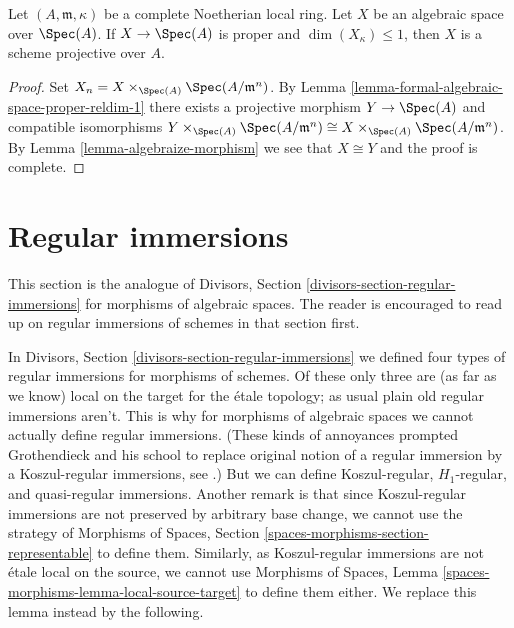 \begin{lemma}
\label{lemma-projective-over-complete}
Let $(A, \mathfrak m, \kappa)$ be a complete Noetherian local ring.
Let $X$ be an algebraic space over $\Spec(A)$.
If $X \to \Spec(A)$ is proper and $\dim(X_\kappa) \leq 1$, then
$X$ is a scheme projective over $A$.
\end{lemma}

\begin{proof}
Set $X_n = X \times_{\Spec(A)} \Spec(A/\mathfrak m^n)$.
By Lemma \ref{lemma-formal-algebraic-space-proper-reldim-1}
there exists a projective morphism $Y \to \Spec(A)$
and compatible isomorphisms
$Y \times_{\Spec(A)} \Spec(A/\mathfrak m^n) \cong
X \times_{\Spec(A)} \Spec(A/\mathfrak m^n)$.
By Lemma \ref{lemma-algebraize-morphism}
we see that $X \cong Y$ and the proof is complete.
\end{proof}










\section{Regular immersions}
\label{section-regular-immersions}

\noindent
This section is the analogue of
Divisors, Section \ref{divisors-section-regular-immersions}
for morphisms of algebraic spaces. The reader is encouraged to read up
on regular immersions of schemes in that section first.

\medskip\noindent
In
Divisors, Section \ref{divisors-section-regular-immersions}
we defined four types of regular immersions for morphisms of schemes.
Of these only three are (as far as we know) local on the target for
the \'etale topology; as usual plain old regular immersions aren't.
This is why for morphisms of algebraic spaces we cannot actually define
regular immersions. (These kinds of annoyances prompted Grothendieck
and his school to replace original notion of a regular immersion by a
Koszul-regular immersions, see
\cite[Exposee VII, Definition 1.4]{SGA6}.)
But we can define Koszul-regular, $H_1$-regular, and quasi-regular immersions.
Another remark is that since Koszul-regular immersions are not preserved by
arbitrary base change, we cannot use the strategy of
Morphisms of Spaces, Section \ref{spaces-morphisms-section-representable}
to define them. Similarly, as Koszul-regular immersions are not \'etale local
on the source, we cannot use
Morphisms of Spaces, Lemma \ref{spaces-morphisms-lemma-local-source-target}
to define them either. We replace this lemma instead by the
following.

